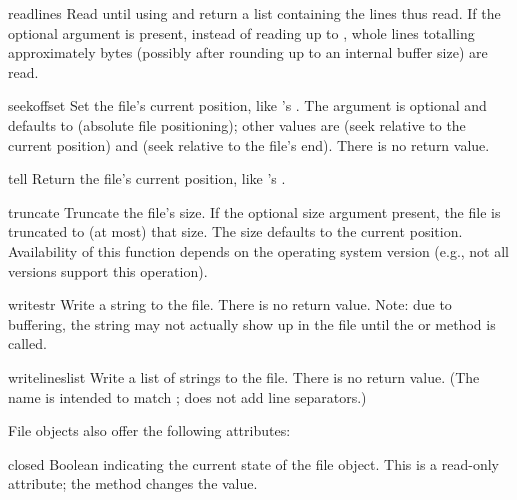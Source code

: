 \begin{methoddesc}[file]{readlines}{}
  Read until \EOF{} using  and return a list containing
  the lines thus read.  If the optional  argument is
  present, instead of reading up to \EOF{}, whole lines totalling
  approximately  bytes (possibly after rounding up to an
  internal buffer size) are read.
\end{methoddesc}

\begin{methoddesc}[file]{seek}{offset}
  Set the file's current position, like 's .
  The  argument is optional and defaults to 
  (absolute file positioning); other values are  (seek
  relative to the current position) and  (seek relative to the
  file's end).  There is no return value.
\end{methoddesc}

\begin{methoddesc}[file]{tell}{}
  Return the file's current position, like 's
  .
\end{methoddesc}

\begin{methoddesc}[file]{truncate}{}
Truncate the file's size.  If the optional size argument present, the
file is truncated to (at most) that size.  The size defaults to the
current position.  Availability of this function depends on the
operating system version (e.g., not all \UNIX{} versions support this
operation).
\end{methoddesc}

\begin{methoddesc}[file]{write}{str}
Write a string to the file.  There is no return value.  Note: due to
buffering, the string may not actually show up in the file until
the  or  method is called.
\end{methoddesc}

\begin{methoddesc}[file]{writelines}{list}
Write a list of strings to the file.  There is no return value.
(The name is intended to match ;
 does not add line separators.)
\end{methoddesc}


File objects also offer the following attributes:

\begin{memberdesc}[file]{closed}
Boolean indicating the current state of the file object.  This is a
read-only attribute; the  method changes the value.
\end{memberdesc}


